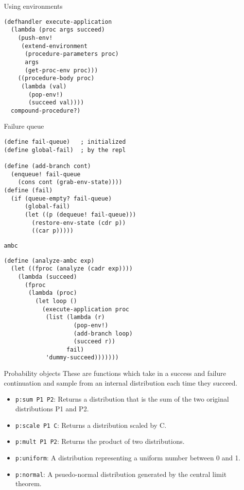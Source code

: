 \documentclass[14pt]{beamer}
\begin{document}
\begin{frame}[fragile]{Using environments}
  \begin{lstlisting}
(defhandler execute-application
  (lambda (proc args succeed)
    (push-env! 
     (extend-environment
      (procedure-parameters proc)
      args
      (get-proc-env proc)))
    ((procedure-body proc)
     (lambda (val)
       (pop-env!)
       (succeed val))))
  compound-procedure?)
  \end{lstlisting}
\end{frame}

\begin{frame}[fragile]{Failure queue}
  \begin{lstlisting}
(define fail-queue)   ; initialized
(define global-fail)  ; by the repl

(define (add-branch cont)
  (enqueue! fail-queue
    (cons cont (grab-env-state))))
(define (fail)
  (if (queue-empty? fail-queue)
      (global-fail)
      (let ((p (dequeue! fail-queue)))
        (restore-env-state (cdr p))
        ((car p)))))
  \end{lstlisting}
\end{frame}

\begin{frame}[fragile]{\texttt{ambc}}
  \begin{lstlisting}
(define (analyze-ambc exp)
  (let ((fproc (analyze (cadr exp))))
    (lambda (succeed)
      (fproc
       (lambda (proc)
         (let loop ()     
           (execute-application proc
            (list (lambda (r)
                    (pop-env!)
                    (add-branch loop)
                    (succeed r))
                  fail)
            'dummy-succeed)))))))
  \end{lstlisting}
\end{frame}

\begin{frame}{Probability objects}
  These are functions which take in a success and failure continuation
  and sample from an internal distribution each time they succeed.
  \pause
  \begin{itemize}
  \item \texttt{p:sum P1 P2}: Returns a distribution that is the sum
    of the two original distributions P1 and P2.
  \item \texttt{p:scale P1 C}: Returns a distribution scaled by C.
  \item \texttt{p:mult P1 P2}: Returns the product of two
    distributions.
  \item \texttt{p:uniform}: A distribution representing a uniform
    number between 0 and 1.
  \item \texttt{p:normal}: A psuedo-normal distribution generated by
    the central limit theorem.
  \end{itemize}
\end{frame}
\end{document}
